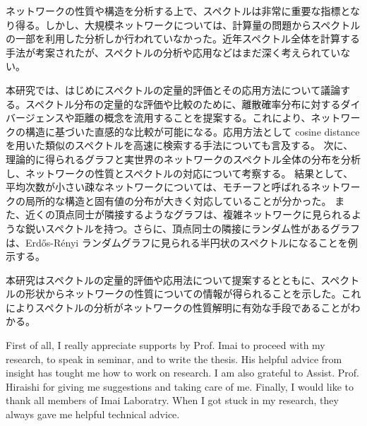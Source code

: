 \documentclass[senior,final,11pt]{iscs-thesis}
\begin{document}
\begin{jabstract}
    ネットワークの性質や構造を分析する上で、スペクトルは非常に重要な指標となり得る。しかし、大規模ネットワークについては、計算量の問題からスペクトルの一部を利用した分析しか行われていなかった。近年スペクトル全体を計算する手法が考案されたが、スペクトルの分析や応用などはまだ深く考えられていない。

    本研究では、はじめにスペクトルの定量的評価とその応用方法について議論する。スペクトル分布の定量的な評価や比較のために、離散確率分布に対するダイバージェンスや距離の概念を流用することを提案する。これにより、ネットワークの構造に基づいた直感的な比較が可能になる。応用方法として cosine distance を用いた類似のスペクトルを高速に検索する手法についても言及する。 次に、理論的に得られるグラフと実世界のネットワークのスペクトル全体の分布を分析し、ネットワークの性質とスペクトルの対応について考察する。 結果として、平均次数が小さい疎なネットワークについては、モチーフと呼ばれるネットワークの局所的な構造と固有値の分布が大きく対応していることが分かった。 また、近くの頂点同士が隣接するようなグラフは、複雑ネットワークに見られるような鋭いスペクトルを持つ。さらに、頂点同士の隣接にランダム性があるグラフは、Erdős-Rényi ランダムグラフに見られる半円状のスペクトルになることを例示する。

    本研究はスペクトルの定量的評価や応用法について提案するとともに、スペクトルの形状からネットワークの性質についての情報が得られることを示した。これによりスペクトルの分析がネットワークの性質解明に有効な手段であることがわかる。
\end{jabstract}
\maketitle

\begin{acknowledge}
    First of all, I really appreciate supports by Prof. Imai to proceed with my
    research, to speak in seminar, and to write the thesis. His helpful advice from insight has tought me how to work on research. I am also grateful to Assist. Prof. Hiraishi for giving me suggestions and taking care of me. Finally, I would like to thank all members of Imai Laboratry. When
    I got stuck in my research, they always gave me helpful technical advice.
\end{acknowledge}

\frontmatter %
\tableofcontents %
\mainmatter %
\end{document}
